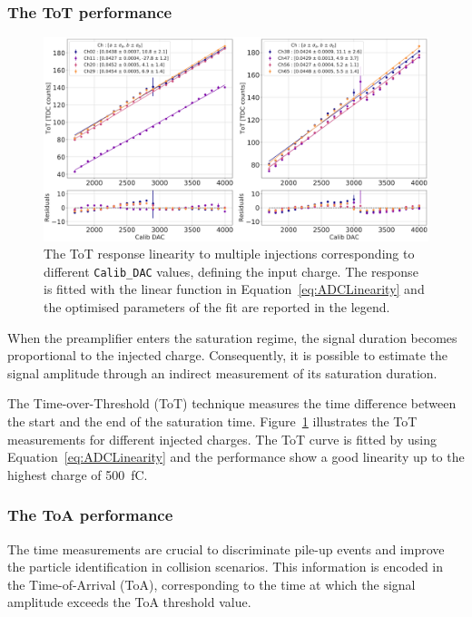 \subsubsection{The ToT performance}
\label{subsubsec:The ToT performance}

\begin{figure}[b!]
    \centering
    \includegraphics[width=0.75\linewidth]{Figures/HGCAL/TOT_Injection.pdf}
    \caption{The ToT response linearity to multiple injections corresponding to different \texttt{Calib\_DAC} values, defining the input charge. The  response is fitted with the linear function in Equation~\ref{eq:ADCLinearity} and the optimised parameters of the fit are reported in the legend.}
    \label{fig:TOT_Injection}
\end{figure}

When the preamplifier enters the saturation regime, the signal duration becomes proportional to the injected charge. Consequently, it is possible to estimate the signal amplitude through an indirect measurement of its saturation duration.

The Time-over-Threshold (ToT) technique measures the time difference between the start and the end of the saturation time. Figure~\ref{fig:TOT_Injection} illustrates the ToT measurements for different injected charges. The ToT curve is fitted by using Equation~\ref{eq:ADCLinearity} and the performance show a good linearity up to the highest charge of 500~fC. 

\subsubsection{The ToA performance}
\label{subsubsec:The ToA performance}

The time measurements are crucial to discriminate pile-up events and improve the particle identification in collision scenarios. This information is encoded in the Time-of-Arrival (ToA), corresponding to the time at which the signal amplitude exceeds the ToA threshold value.

